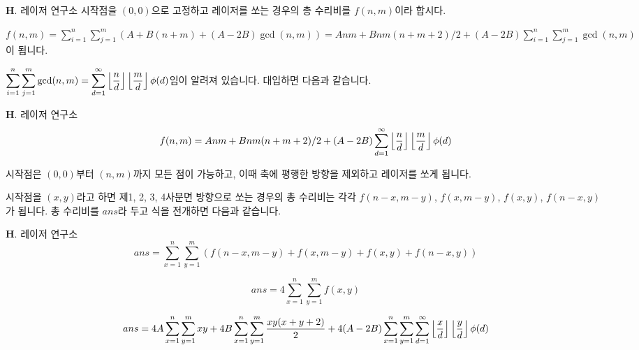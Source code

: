 \begin{frame}{\textbf{H}. 레이저 연구소}
    시작점을 $(0, 0)$으로 고정하고 레이저를 쏘는 경우의 총 수리비를 $f(n, m)$이라 합시다. 
    
    \vspace{18pt}

    $f(n, m) = \displaystyle \sum_{i=1}^{n} \displaystyle \sum_{j=1}^{m} \left(A+B(n+m) + (A-2B)\operatorname{gcd}(n, m)\right) = Anm + Bnm(n+m+2)/2 + (A-2B) \displaystyle \sum_{i=1}^{n} \displaystyle \sum_{j=1}^{m} \operatorname{gcd}(n, m)$ 이 됩니다.
    
    \vspace{18pt}
    
    $\displaystyle \sum_{i=1}^{n} \displaystyle \sum_{j=1}^{m} \operatorname{gcd}(n, m) = \displaystyle \sum_{d=1}^{\infty} \left\lfloor{n \over d}\right\rfloor\left\lfloor{m \over d}\right\rfloor \phi(d)$임이 알려져 있습니다. 대입하면 다음과 같습니다.
    
\end{frame}

\begin{frame}{\textbf{H}. 레이저 연구소}
    $$f(n, m) = Anm + Bnm(n+m+2)/2 + (A-2B) \displaystyle \sum_{d=1}^{\infty} \left\lfloor{n \over d}\right\rfloor\left\lfloor{m \over d}\right\rfloor \phi(d)$$

    \vspace{18pt}
    
    시작점은 $(0, 0)$부터 $(n, m)$까지 모든 점이 가능하고, 이때 축에 평행한 방향을 제외하고 레이저를 쏘게 됩니다. 
    
    \vspace{18pt}
    
    시작점을 $(x, y)$라고 하면 제1, 2, 3, 4사분면 방향으로 쏘는 경우의 총 수리비는 각각 $f(n-x, m-y)$, $f(x, m-y)$, $f(x, y)$, $f(n-x, y)$가 됩니다. 총 수리비를 $ans$라 두고 식을 전개하면 다음과 같습니다.
    
\end{frame}

\begin{frame}{\textbf{H}. 레이저 연구소}
    $$ans= \displaystyle \sum_{x=1}^{n} \displaystyle \sum_{y=1}^{m} (f(n-x, m-y)+f(x, m-y)+f(x, y)+f(n-x, y))$$

    \vspace{18pt}
    
    $$ans= 4\displaystyle \sum_{x=1}^{n} \displaystyle \sum_{y=1}^{m} f(x, y)$$
    
    \vspace{18pt}
    
    $$ans= 4A\displaystyle \sum_{x=1}^{n} \displaystyle \sum_{y=1}^{m} xy + 4B\displaystyle \sum_{x=1}^{n} \displaystyle \sum_{y=1}^{m} {xy(x+y+2) \over 2} + 4(A-2B)\displaystyle \sum_{x=1}^{n} \displaystyle \sum_{y=1}^{m} \displaystyle \sum_{d=1}^{\infty} \left\lfloor{x \over d}\right\rfloor\left\lfloor{y \over d}\right\rfloor \phi(d)$$

    \vspace{18pt}
\end{frame}

